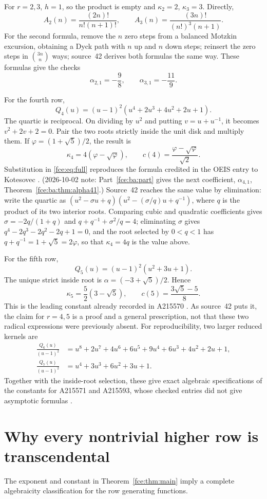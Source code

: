 \documentclass[11pt,a4paper]{article}
\numberwithin{equation}{section}
\theoremstyle{definition}\newtheorem{definition}[theorem]{Definition}
\theoremstyle{remark}\newtheorem{remark}[theorem]{Remark}
\begin{document}
For $r=2,3$, $h=1$, so the product is empty and $\kappa_2=2$,
$\kappa_3=3$. Directly,
\[
 A_2(n)=\frac{(2n)!}{n!(n+1)!},\qquad
 A_3(n)=\frac{(3n)!}{(n!)^3(n+1)}.
\]
For the second formula, remove the $n$ zero steps from a balanced Motzkin
excursion, obtaining a Dyck path with $n$ up and $n$ down steps; reinsert
the zero steps in $\binom{3n}{n}$ ways; source~42 derives both formulas
the same way. These formulas give the checks
\[
 \alpha_{2,1}=-\frac98,\qquad \alpha_{3,1}=-\frac{11}{9}.
\]

For the fourth row,
\[
 Q_4(u)=(u-1)^2(u^4+2u^3+4u^2+2u+1).
\]
The quartic is reciprocal. On dividing by $u^2$ and putting $v=u+u^{-1}$,
it becomes $v^2+2v+2=0$. Pair the two roots strictly inside the unit disk
and multiply them. If $\varphi=(1+\sqrt5)/2$, the result is
\[
 \kappa_4=4(\varphi-\sqrt\varphi),\qquad
 c(4)=\frac{\varphi-\sqrt\varphi}{\sqrt2}.
\]
Substitution in \eqref{fce:eq:full} reproduces the formula credited in the
OEIS entry to Kotesovec \cite{oeis4}. (2026-10-02 note: Part~\ref{fce:ba:part}
gives the next coefficient, $\alpha_{4,1}$, Theorem~\ref{fce:ba:thm:alpha41}.) Source~42 reaches the same value by
elimination: write the quartic as
$(u^2-\sigma u+q)(u^2-(\sigma/q)u+q^{-1})$, where $q$ is the product of its
two interior roots. Comparing cubic and quadratic coefficients gives
$\sigma=-2q/(1+q)$ and $q+q^{-1}+\sigma^2/q=4$; eliminating $\sigma$ gives
$q^4-2q^3-2q^2-2q+1=0$, and the root selected by $0<q<1$ has
$q+q^{-1}=1+\sqrt5=2\varphi$, so that $\kappa_4=4q$ is the value above.

For the fifth row,
\[
 Q_5(u)=(u-1)^2(u^2+3u+1).
\]
The unique strict inside root is $\alpha=(-3+\sqrt5)/2$. Hence
\[
 \kappa_5=\frac52(3-\sqrt5),\qquad c(5)=\frac{3\sqrt5-5}{8}.
\]
This is the leading constant already recorded in A215570 \cite{oeis5}.
As source~42 puts it, the claim for $r=4,5$ is a proof and a general
prescription, not that these two radical expressions were previously
absent.
For reproducibility, two larger reduced kernels are
\begin{align*}
 \frac{Q_6(u)}{(u-1)^2}
 &=u^8+2u^7+4u^6+6u^5+9u^4+6u^3+4u^2+2u+1,\\
 \frac{Q_7(u)}{(u-1)^2}
 &=u^4+3u^3+6u^2+3u+1.
\end{align*}
Together with the inside-root selection, these give exact algebraic
specifications of the constants for A215571 and A215593, whose checked
entries did not give asymptotic formulas \cite{oeis6,oeis7}.

\section{Why every nontrivial higher row is transcendental}\label{fce:sec:transcendence}
The exponent and constant in Theorem~\ref{fce:thm:main} imply a complete
algebraicity classification for the row generating functions.
\end{document}
